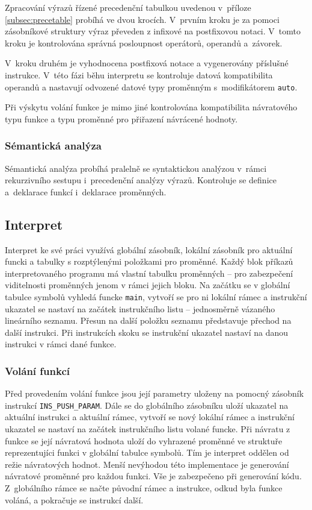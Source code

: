 \documentclass[a4paper, 12pt]{article}
\begin{document}
Zpracování výrazů řízené precedenční tabulkou uvedenou v~příloze
\ref{subsec:precetable} probíhá ve dvou krocích. V~prvním kroku je za pomoci
zásobníkové struktury výraz převeden z infixové
na postfixovou notaci. V~tomto kroku je kontrolována správná posloupnost
operátorů, operandů a~závorek.

V~kroku druhém je vyhodnocena postfixová notace a vygenerovány příslušné 
instrukce. V~této fázi běhu interpretu se kontroluje datová kompatibilita 
operandů a nastavují odvozené datové typy proměnným s~modifikátorem 
\texttt{auto}.

Při výskytu volání funkce je mimo jiné kontrolována kompatibilita návratového
typu funkce a typu proměnné pro přiřazení návrácené hodnoty.

\subsubsection{Sémantická analýza}
Sémantická analýza probíhá pralelně se syntaktickou analýzou v~rámci
rekurzivního sestupu i~precedenční analýzy výrazů. Kontroluje se definice
a~deklarace funkcí i~deklarace proměnných.

\subsection{Interpret} \label{interpret}
Interpret ke své práci využívá globální zásobník, lokální zásobník pro aktuální
funcki a tabulky s rozptýlenými položkami pro proměnné. Každý blok příkazů
interpretovaného programu má vlastní tabulku proměnných -- pro zabezpečení viditelnosti
proměnných jenom v rámci jejich bloku.
Na začátku se v globální tabulce symbolů vyhledá funcke \texttt{main},
vytvoří se pro ni lokální rámec a instrukční ukazatel se nastaví na začátek
instrukčního listu -- jednosměrně vázaného lineárního seznamu.
Přesun na další položku seznamu představuje přechod na další instrukci.
Při instrukcích skoku se instrukční ukazatel nastaví
na danou instrukci v rámci dané funkce.

\subsubsection{Volání funkcí}
Před provedením volání funkce jsou její parametry uloženy na pomocný zásobník
instrukcí \texttt{INS\_PUSH\_PARAM}. Dále se do globálního zásobníku uloží
ukazatel na aktuální instrukci a aktuální rámec, vytvoří se nový lokální rámec
a instrukční ukazatel se nastaví na začátek instrukčního listu volané funcke.
Při návratu z funkce se její návratová hodnota uloží do vyhrazené
proměnné ve struktuře reprezentujíci funkci v globální tabulce symbolů.
Tím je interpret oddělen od režie návratových hodnot. Menší nevýhodou této
implementace je generování návratové proměnné pro každou funkci.
Vše je zabezpečeno při generování kódu. Z~globálního rámce se načte původní
rámec a instrukce, odkud byla funkce voláná, a pokračuje se instrukcí další.
\end{document}
